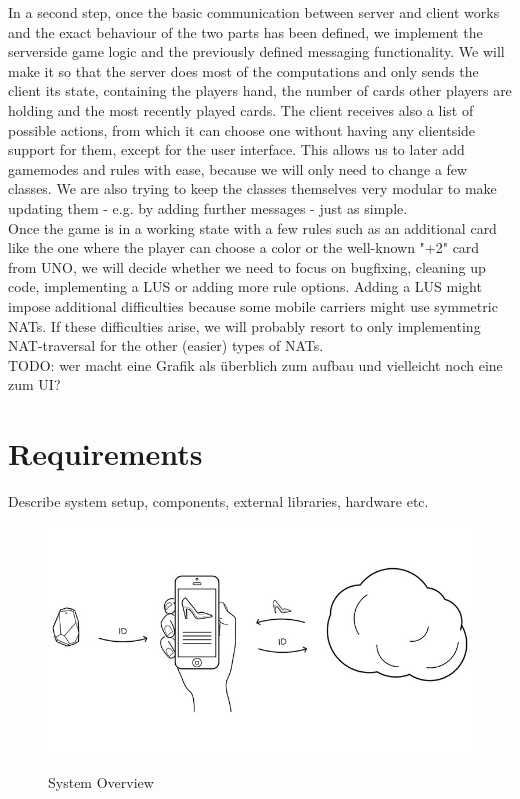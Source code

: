 \documentclass{report}
\newcommand{\lfig}[1]{\label{fig:#1}}
\begin{document}
In a second step, once the basic communication between server and client works and the exact behaviour of the two parts has been defined, we implement the serverside game logic and the previously defined messaging functionality.
We will make it so that the server does most of the computations and only sends the client its state, containing the players hand, the number of cards other players are holding and the most recently played cards. The client receives also a list of possible actions, from which it can choose one without having any clientside support for them, except for the user interface. This allows us to later add gamemodes and rules with ease, because we will only need to change a few classes.
We are also trying to keep the classes themselves very modular to make updating them - e.g. by adding further messages - just as simple.\\
Once the game is in a working state with a few rules such as an additional card like the one where the player can choose a color or the well-known "+2" card from UNO, we will decide whether we need to focus on bugfixing, cleaning up code, implementing a LUS or adding more rule options. Adding a LUS might impose additional difficulties because some mobile carriers might use symmetric NATs. If these difficulties arise, we will probably resort to only implementing NAT-traversal for the other (easier) types of NATs.\\
\newline
\newline
TODO: wer macht eine Grafik als überblich zum aufbau und vielleicht noch eine zum UI?


\section{Requirements}
Describe system setup, components, external libraries, hardware etc.


\begin{figure}[h]
	\centering
    \includegraphics[width=\columnwidth]{overview.jpg}
    \lfig{system-overview}
    \vspace{-5mm} %
	\caption{System Overview~\cite{estimote}}
\end{figure}
\end{document}
